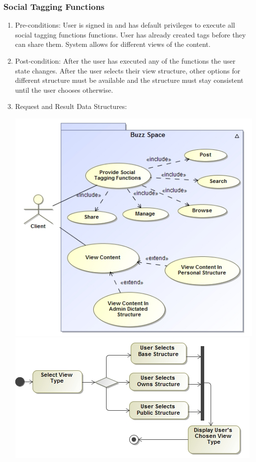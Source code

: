 \documentclass[hidelinks, 12pt, oneside]{article}
\begin{document}
\subsubsection{Social Tagging Functions}
\begin{enumerate}
\item Pre-conditions: User is signed in and has default privileges to execute all social tagging functions functions. User has already created tags before they can share them. System allows for different views of the content.
\item Post-condition: After the user has executed any of the functions the user state changes. After the user selects their view structure, other options for different structure must be available and the structure must stay consistent until the user chooses otherwise.
\item Request and Result Data Structures:
\begin{center}
\includegraphics[scale=0.5]{socialTagging.jpg}\\
\includegraphics[scale=0.5]{socialTaggingActivity.jpg}
\end{center}
\end{enumerate}
\end{document}
